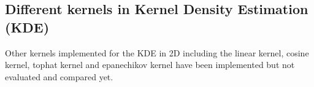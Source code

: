 \documentclass[journal, a4paper]{IEEEtran}
\begin{document}


\subsection{Different kernels in Kernel Density Estimation (KDE)} 

Other kernels implemented for the KDE in 2D including the linear kernel, cosine kernel, tophat kernel and epanechikov kernel 
have been implemented but not evaluated and compared yet.

\end{document}
